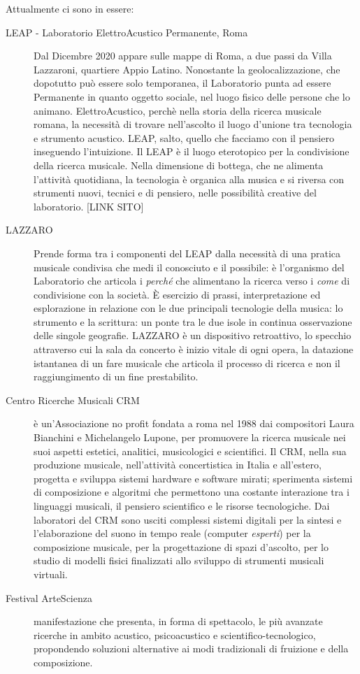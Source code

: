 \documentclass{gs-adonis}
\begin{document}
Attualmente ci sono in essere:

\begin{description}
  \item[LEAP - Laboratorio ElettroAcustico Permanente, Roma] Dal Dicembre 2020
  appare sulle mappe di Roma, a due passi da Villa Lazzaroni, quartiere Appio
  Latino. Nonostante la geolocalizzazione, che dopotutto può essere solo
  temporanea, il Laboratorio punta ad essere Permanente in quanto oggetto sociale,
  nel luogo fisico delle persone che lo animano. ElettroAcustico, perchè nella
  storia della ricerca musicale romana, la necessità di trovare nell'ascolto
  il luogo d'unione tra tecnologia e strumento acustico. LEAP, salto, quello che
  facciamo con il pensiero inseguendo l'intuizione.
  Il LEAP è il luogo eterotopico per la condivisione della ricerca musicale.
  Nella dimensione di bottega, che ne alimenta l'attività quotidiana, la tecnologia
  è organica alla musica e si riversa con strumenti nuovi, tecnici e di pensiero,
  nelle possibilità creative del laboratorio. [LINK SITO]
  \item[LAZZARO] Prende forma tra i componenti del LEAP dalla necessità di una
  pratica musicale condivisa che medi il conosciuto e il possibile: è l'organismo
  del Laboratorio che articola i \emph{perché} che alimentano la ricerca verso
  i \emph{come} di condivisione con la società. È esercizio di prassi, interpretazione
  ed esplorazione in relazione con le due principali tecnologie della musica: lo
  strumento e la scrittura: un ponte tra le due isole in continua osservazione
  delle singole geografie. LAZZARO è un dispositivo retroattivo, lo specchio
  attraverso cui la sala da concerto è inizio vitale di ogni opera, la datazione
  istantanea di un fare musicale che articola il processo di ricerca e non il
  raggiungimento di un fine prestabilito.
  \item[Centro Ricerche Musicali CRM] è un'Associazione no profit fondata a roma
  nel 1988 dai compositori Laura Bianchini e Michelangelo Lupone, per promuovere
  la ricerca musicale nei suoi aspetti estetici, analitici, musicologici e scientifici.
  Il CRM, nella sua produzione musicale, nell'attività concertistica in Italia e
  all'estero, progetta e sviluppa sistemi hardware e software mirati; sperimenta
  sistemi di composizione e algoritmi che permettono una costante interazione tra
  i linguaggi musicali, il pensiero scientifico e le risorse tecnologiche.
  Dai laboratori del CRM sono usciti complessi sistemi digitali per la sintesi
  e l'elaborazione del suono in tempo reale (computer \emph{esperti}) per la
  composizione musicale, per la progettazione di spazi d'ascolto, per lo studio
  di modelli fisici finalizzati allo sviluppo di strumenti musicali virtuali.
  \item[Festival ArteScienza] manifestazione che presenta, in forma di spettacolo,
  le più avanzate ricerche in ambito acustico, psicoacustico e scientifico-tecnologico,
  propondendo soluzioni alternative ai modi tradizionali di fruizione e della composizione.
\end{description}
\end{document}
